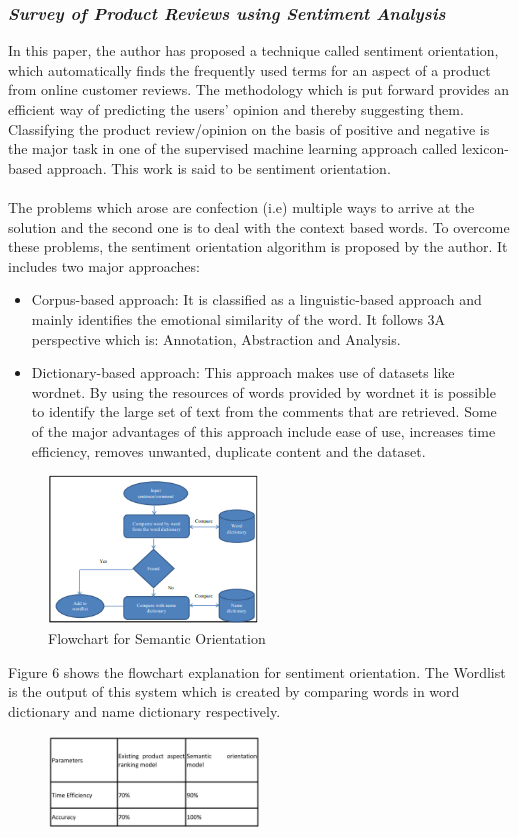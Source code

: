 \documentclass[conference]{IEEEtran}
\begin{document}
\subsubsection{\textit{Survey of Product Reviews using Sentiment Analysis\cite{b8}}}
In this paper, the author has proposed a technique called sentiment orientation, which automatically finds the frequently used terms for an aspect of a product from online customer reviews. The methodology which is put forward provides an efficient way of predicting the users' opinion and thereby suggesting them. Classifying the product review/opinion on the basis of positive and negative is the major task in one of the supervised machine learning approach called lexicon-based approach. This work is said to be sentiment orientation.\\\\
The problems which arose are confection (i.e) multiple ways to arrive at the solution and the second one is to deal with the context based words. To overcome these problems, the sentiment orientation algorithm is proposed by the author. It includes two major approaches:
\begin{itemize}
	\item Corpus-based approach: It is classified as a linguistic-based approach and mainly identifies the emotional similarity of the word. It follows 3A perspective which is: Annotation, Abstraction and Analysis.
	\item Dictionary-based approach: This approach makes use of datasets like wordnet. By using the resources of words provided by wordnet it is possible to identify the large set of text from the comments that are retrieved. Some of the major advantages of this approach include ease of use, increases time efficiency, removes unwanted, duplicate content and the dataset.
\end{itemize}

\begin{figure}[!ht]
	\centering
	\includegraphics[width=0.5\textwidth]{SO.png}
	\caption{Flowchart for Semantic Orientation}
\end{figure}
Figure 6 shows the flowchart explanation for sentiment orientation. The Wordlist is the output of this system which is created by comparing words in word dictionary and name dictionary respectively.
\begin{figure}[!ht]
	\centering
	\includegraphics[width=0.5\textwidth]{table2-1.jpg}
\end{figure}
\end{document}
